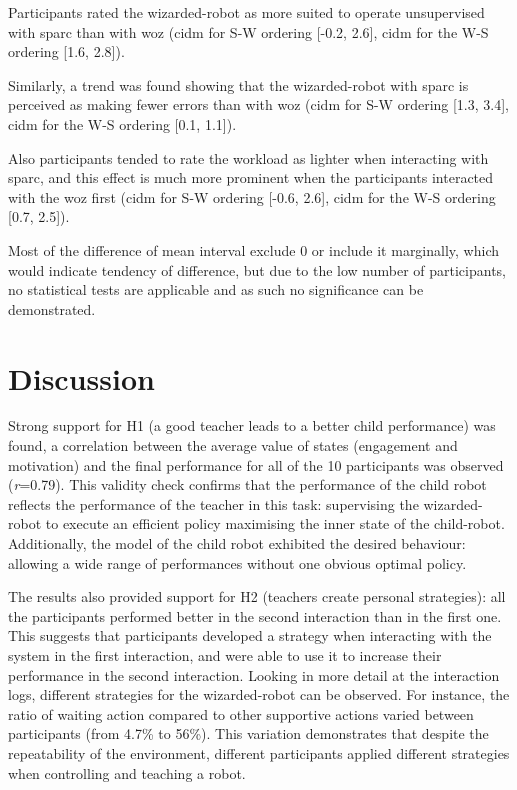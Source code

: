 Participants rated the wizarded-robot as more suited to operate unsupervised with \gls{sparc} than with \gls{woz}  (\gls{cidm} for S-W ordering [-0.2, 2.6], \gls{cidm} for the W-S ordering [1.6, 2.8]).

Similarly, a trend was found showing that the wizarded-robot with \gls{sparc} is perceived as making fewer errors than with \gls{woz} (\gls{cidm} for S-W ordering [1.3, 3.4], \gls{cidm} for the W-S ordering [0.1, 1.1]). 

Also participants tended to rate the workload as lighter when interacting with \gls{sparc}, and this effect is much more prominent when the participants interacted with the \gls{woz} first (\gls{cidm} for S-W ordering [-0.6, 2.6], \gls{cidm} for the W-S ordering [0.7, 2.5]).

Most of the difference of mean interval exclude 0 or include it marginally, which would indicate tendency of difference, but due to the low number of participants, no statistical tests are applicable and as such no significance can be demonstrated. 

\section{Discussion}

Strong support for H1 (a good teacher leads to a better child performance) was found, a correlation between the average value of states (engagement and motivation) and the final performance for all of the 10 participants was observed (\textit{r}=0.79). This validity check confirms that the performance of the child robot reflects the performance of the teacher in this task: supervising the wizarded-robot to execute an efficient policy maximising the inner state of the child-robot. Additionally, the model of the child robot exhibited the desired behaviour: allowing a wide range of performances without one obvious optimal policy.

The results also provided support for H2 (teachers create personal strategies): all the participants performed better in the second interaction than in the first one. This suggests that participants developed a strategy when interacting with the system in the first interaction, and were able to use it to increase their performance in the second interaction. Looking in more detail at the interaction logs, different strategies for the wizarded-robot can be observed. For instance, the ratio of waiting action compared to other supportive actions varied between participants (from 4.7\% to 56\%). This variation demonstrates that despite the repeatability of the environment, different participants applied different strategies when controlling and teaching a robot.

